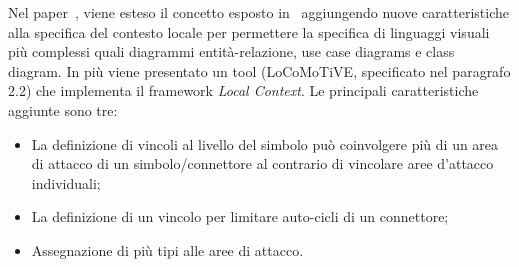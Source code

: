         

        \noindent
        Nel paper~\cite{extending_localcontext}, viene esteso il concetto esposto in~\cite{localcontext_recognition} aggiungendo nuove caratteristiche alla specifica del contesto locale per permettere la specifica di linguaggi visuali più complessi quali diagrammi entità-relazione, use case diagrams e class diagram. In più viene presentato un tool (LoCoMoTiVE, specificato nel paragrafo 2.2) che implementa il framework \textit{Local Context}.
        \newline
        Le principali caratteristiche aggiunte sono tre:
        \begin{itemize}
            \item La definizione di vincoli al livello del simbolo può coinvolgere più di un area di attacco di un simbolo/connettore al contrario di vincolare aree d'attacco individuali;
            \item La definizione di un vincolo per limitare auto-cicli di un connettore;
            \item Assegnazione di più tipi alle aree di attacco.
        \end{itemize}

